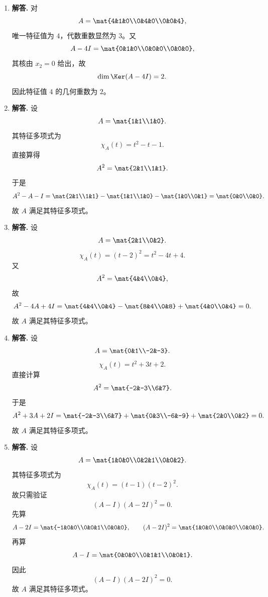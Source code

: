 \begin{enumerate}[label=\textbf{\arabic*.}, leftmargin=*, itemsep=1em]
\item \textbf{解答.} 对
\[
A=\mat{4&1&0\\0&4&0\\0&0&4},
\]
唯一特征值为 \(4\)，代数重数显然为 \(3\)。又
\[
A-4I=\mat{0&1&0\\0&0&0\\0&0&0},
\]
其核由 \(x_2=0\) 给出，故
\[
\dim\Ker(A-4I)=2.
\]
因此特征值 \(4\) 的几何重数为 \(2\)。

\item \textbf{解答.} 设
\[
A=\mat{1&1\\1&0}.
\]
其特征多项式为
\[
\chi_A(t)=t^2-t-1.
\]
直接算得
\[
A^2=\mat{2&1\\1&1}.
\]
于是
\[
A^2-A-I
=\mat{2&1\\1&1}-\mat{1&1\\1&0}-\mat{1&0\\0&1}
=\mat{0&0\\0&0}.
\]
故 \(A\) 满足其特征多项式。

\item \textbf{解答.} 设
\[
A=\mat{2&1\\0&2}.
\]
\[
\chi_A(t)=(t-2)^2=t^2-4t+4.
\]
又
\[
A^2=\mat{4&4\\0&4},
\]
故
\[
A^2-4A+4I
=\mat{4&4\\0&4}-\mat{8&4\\0&8}+\mat{4&0\\0&4}
=0.
\]
故 \(A\) 满足其特征多项式。

\item \textbf{解答.} 设
\[
A=\mat{0&1\\-2&-3}.
\]
\[
\chi_A(t)=t^2+3t+2.
\]
直接计算
\[
A^2=\mat{-2&-3\\6&7}.
\]
于是
\[
A^2+3A+2I
=\mat{-2&-3\\6&7}+\mat{0&3\\-6&-9}+\mat{2&0\\0&2}
=0.
\]
故 \(A\) 满足其特征多项式。

\item \textbf{解答.} 设
\[
A=\mat{1&0&0\\0&2&1\\0&0&2}.
\]
其特征多项式为
\[
\chi_A(t)=(t-1)(t-2)^2.
\]
故只需验证
\[
(A-I)(A-2I)^2=0.
\]
先算
\[
A-2I=\mat{-1&0&0\\0&0&1\\0&0&0},
\qquad
(A-2I)^2=\mat{1&0&0\\0&0&0\\0&0&0}.
\]
再算
\[
A-I=\mat{0&0&0\\0&1&1\\0&0&1}.
\]
因此
\[
(A-I)(A-2I)^2=0.
\]
故 \(A\) 满足其特征多项式。


\end{enumerate}

